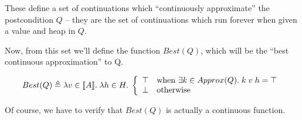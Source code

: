 These define a set of continuations which ``continuously approximate''
the postcondition $Q$ -- they are the set of continuations which run
forever when given a value and heap in $Q$.

Now, from this set we'll define the function $Best(Q)$, which will be the
``best continuous approximation'' to Q. 

\begin{displaymath}
  Best(Q) \triangleq \lambda v \in [\![{A}]\!].\; \lambda h \in H.\; 
    \left\{\begin{array}{ll}
             \top & \mbox{when } \exists k \in Approx(Q).\; k\;v\;h = \top \\
             \bot & \mbox{otherwise}
           \end{array}
    \right.
\end{displaymath}

Of course, we have to verify that $Best(Q)$ is actually a continuous function. 


